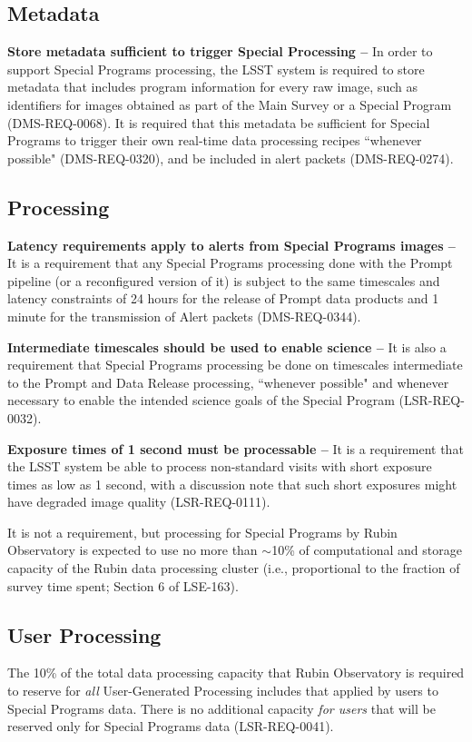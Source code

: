 \subsection{Metadata}\label{ssec:req_meta}

\textbf{Store metadata sufficient to trigger Special Processing -- }
In order to support Special Programs processing, the LSST system is 
required to store metadata that includes program information for every raw 
image, such as identifiers for images obtained as part of the Main Survey 
or a Special Program (DMS-REQ-0068).
It is required that this metadata be sufficient for Special Programs to 
trigger their own real-time data processing recipes ``whenever possible" 
(DMS-REQ-0320), and be included in alert packets (DMS-REQ-0274).


\subsection{Processing}\label{ssec:req_proc}

\textbf{Latency requirements apply to alerts from Special Programs images --}
It is a requirement that any Special Programs processing done with the 
Prompt pipeline (or a reconfigured version of it) is subject to the same 
timescales and latency constraints of 24 hours for the release of Prompt 
data products and 1 minute for the transmission of Alert packets 
(DMS-REQ-0344).

\textbf{Intermediate timescales should be used to enable science --}
It is also a requirement that Special Programs processing be done on 
timescales intermediate to the Prompt and Data Release processing, 
``whenever possible" and whenever necessary to enable the intended science 
goals of the Special Program (LSR-REQ-0032).

\textbf{Exposure times of 1 second must be processable -- }
It is a requirement that the LSST system be able to process non-standard 
visits with short exposure times as low as 1 second, with a discussion 
note that such short exposures might have degraded image quality 
(LSR-REQ-0111).

It is not a requirement, but processing for Special Programs by Rubin Observatory is expected to use no 
more than $\sim$10\% of computational and storage capacity of the Rubin data processing cluster 
(i.e., proportional to the fraction of survey time spent; Section 6 of LSE-163).


\subsection{User Processing}\label{ssec:req_ug}

The 10\% of the total data processing capacity that Rubin Observatory is 
required to reserve for \emph{all} User-Generated Processing includes that 
applied by users to Special Programs data.
There is no additional capacity {\it for users} that will be reserved only for Special 
Programs data (LSR-REQ-0041).
